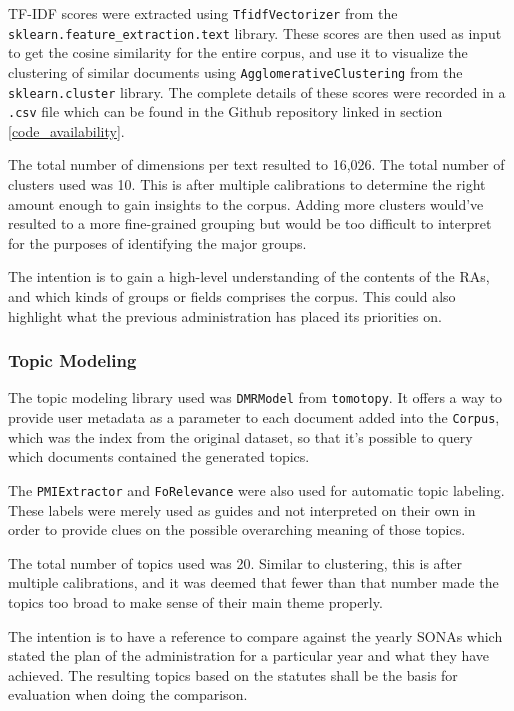 \documentclass[conference]{IEEEtran}
\begin{document}
TF-IDF scores were extracted using \texttt{TfidfVectorizer} from the \texttt{sklearn.feature\_extraction.text} library. These scores are then used as input to get the cosine similarity for the entire corpus, and use it to visualize the clustering of similar documents using \texttt{AgglomerativeClustering} from the \texttt{sklearn.cluster} library. The complete details of these scores were recorded in a \texttt{.csv} file which can be found in the Github repository linked in section \ref{code_availability}.

The total number of dimensions per text resulted to 16,026. The total number of clusters used was 10. This is after multiple calibrations to determine the right amount enough to gain insights to the corpus. Adding more clusters would've resulted to a more fine-grained grouping but would be too difficult to interpret for the purposes of identifying the major groups.

The intention is to gain a high-level understanding of the contents of the RAs, and which kinds of groups or fields comprises the corpus. This could also highlight what the previous administration has placed its priorities on.

\subsubsection{Topic Modeling}

The topic modeling library used was \texttt{DMRModel} from \texttt{tomotopy}. It offers a way to provide user metadata as a parameter to each document added into the \texttt{Corpus}, which was the index from the original dataset, so that it's possible to query which documents contained the generated topics.

The \texttt{PMIExtractor} and \texttt{FoRelevance} were also used for automatic topic labeling. These labels were merely used as guides and not interpreted on their own in order to provide clues on the possible overarching meaning of those topics.

The total number of topics used was 20. Similar to clustering, this is after multiple calibrations, and it was deemed that fewer than that number made the topics too broad to make sense of their main theme properly.

The intention is to have a reference to compare against the yearly SONAs which stated the plan of the administration for a particular year and what they have achieved. The resulting topics based on the statutes shall be the basis for evaluation when doing the comparison.
\end{document}

